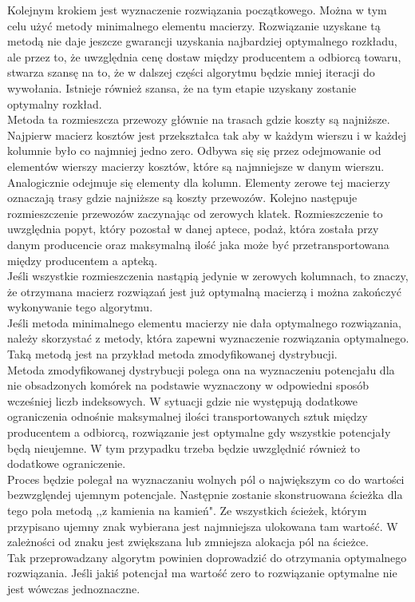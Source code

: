 \documentclass[12pt]{article}
\begin{document}
Kolejnym krokiem jest wyznaczenie rozwiązania początkowego. Można w tym celu użyć metody minimalnego elementu macierzy. Rozwiązanie uzyskane tą metodą nie daje jeszcze gwarancji uzyskania najbardziej optymalnego rozkładu, ale przez to, że uwzględnia cenę dostaw między producentem a odbiorcą towaru, stwarza szansę na to, że w dalszej części algorytmu będzie mniej iteracji do wywołania. Istnieje również szansa, że na tym etapie uzyskany zostanie optymalny rozkład. \\
Metoda ta rozmieszcza przewozy głównie na trasach gdzie koszty są najniższe. Najpierw macierz kosztów jest przekształca tak aby w każdym wierszu i w każdej kolumnie było co najmniej jedno zero. Odbywa się się przez odejmowanie od elementów wierszy macierzy kosztów, które są najmniejsze w danym wierszu. Analogicznie odejmuje się elementy dla kolumn. Elementy zerowe tej macierzy oznaczają trasy gdzie najniższe są koszty przewozów.
Kolejno następuje rozmieszczenie przewozów zaczynając od zerowych klatek. Rozmieszczenie to uwzględnia popyt, który pozostał w danej aptece, podaż, która została przy danym producencie oraz maksymalną ilość jaka może być przetransportowana między producentem a apteką. \\
Jeśli wszystkie rozmieszczenia nastąpią jedynie w zerowych kolumnach, to znaczy, że otrzymana macierz rozwiązań jest już optymalną macierzą i można zakończyć wykonywanie tego algorytmu. \\
Jeśli metoda minimalnego elementu macierzy nie dała optymalnego rozwiązania, należy skorzystać z metody, która zapewni wyznaczenie rozwiązania optymalnego. Taką metodą jest na przykład metoda zmodyfikowanej dystrybucji. \\

Metoda zmodyfikowanej dystrybucji polega ona na wyznaczeniu potencjału dla nie obsadzonych komórek na podstawie wyznaczony w odpowiedni sposób wcześniej liczb indeksowych. W sytuacji gdzie nie występują dodatkowe ograniczenia odnośnie maksymalnej ilości transportowanych sztuk między producentem a odbiorcą, rozwiązanie jest optymalne gdy wszystkie potencjały będą nieujemne. W tym przypadku trzeba będzie uwzględnić również to dodatkowe ograniczenie. \\
Proces będzie polegał na wyznaczaniu wolnych pól o największym co do wartości bezwzglęndej ujemnym potencjale. Następnie zostanie skonstruowana ścieżka dla tego pola metodą ,,z kamienia na kamień". Ze wszystkich ścieżek, którym przypisano ujemny znak wybierana jest najmniejsza ulokowana tam wartość. W zależności od znaku jest zwiększana lub zmniejsza alokacja pól na ścieżce. \\
Tak przeprowadzany algorytm powinien doprowadzić do otrzymania optymalnego rozwiązania.
Jeśli jakiś potencjał ma wartość zero to rozwiązanie optymalne nie jest wówczas jednoznaczne.
\end{document}
